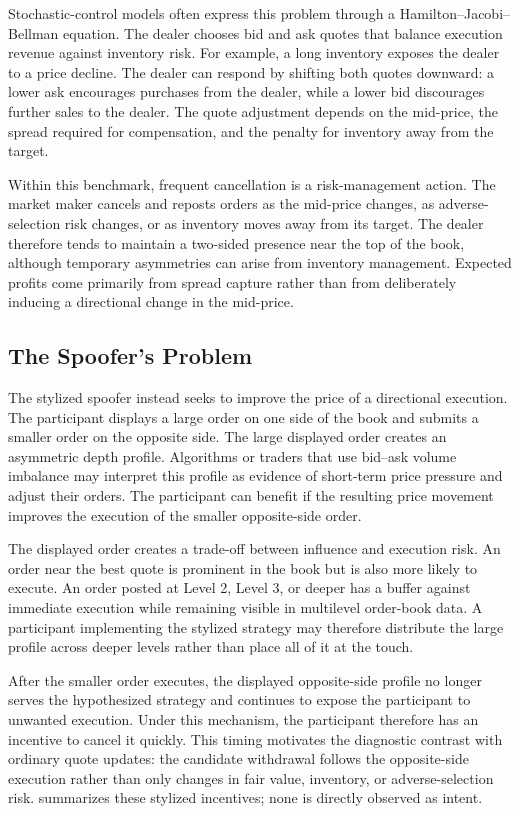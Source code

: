 \documentclass[11pt]{article}
\begin{document}
Stochastic-control models often express this problem through a Hamilton--Jacobi--Bellman equation. The dealer chooses bid
and ask quotes that balance execution revenue against inventory risk. For example, a long inventory exposes the dealer to
a price decline. The dealer can respond by shifting both quotes downward: a lower ask encourages purchases from the
dealer, while a lower bid discourages further sales to the dealer. The quote adjustment depends on the mid-price, the
spread required for compensation, and the penalty for inventory away from the target.

Within this benchmark, frequent cancellation is a risk-management action. The market maker cancels and reposts orders as
the mid-price changes, as adverse-selection risk changes, or as inventory moves away from its target. The dealer therefore
tends to maintain a two-sided presence near the top of the book, although temporary asymmetries can arise from inventory
management. Expected profits come primarily from spread capture rather than from deliberately inducing a directional
change in the mid-price.

\subsection{The Spoofer's Problem}
\label{subsec:spoofing}
The stylized spoofer instead seeks to improve the price of a directional execution. The participant displays a large
order on one side of the book and submits a smaller order on the opposite side. The large displayed order creates an
asymmetric depth profile. Algorithms or traders that use bid--ask volume imbalance may interpret this profile as evidence
of short-term price pressure and adjust their orders. The participant can benefit if the resulting price movement improves
the execution of the smaller opposite-side order.

The displayed order creates a trade-off between influence and execution risk. An order near the best quote is prominent
in the book but is also more likely to execute. An order posted at Level 2, Level 3, or deeper has a buffer against
immediate execution while remaining visible in multilevel order-book data. A participant implementing the stylized
strategy may therefore distribute the large profile across deeper levels rather than place all of it at the touch.

After the smaller order executes, the displayed opposite-side profile no longer serves the hypothesized strategy and
continues to expose the participant to unwanted execution. Under this mechanism, the participant therefore has an
incentive to cancel it quickly. This timing motivates the diagnostic contrast with ordinary quote updates: the candidate
withdrawal follows the opposite-side execution rather than only changes in fair value, inventory, or adverse-selection
risk.  summarizes these stylized incentives; none is directly observed as intent.
\end{document}
